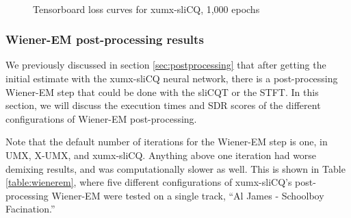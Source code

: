 \documentclass[report.tex]{subfiles}
\begin{document}
\begin{figure}[ht]
	\centering
	\\
	\caption{Tensorboard loss curves for xumx-sliCQ, 1,000 epochs}
	\label{fig:networkloss}
\end{figure}

\newpagefill

\subsubsection{Wiener-EM post-processing results}
\label{sec:wienerconfigs}

We previously discussed in section \ref{sec:postprocessing} that after getting the initial estimate with the xumx-sliCQ neural network, there is a post-processing Wiener-EM step that could be done with the sliCQT or the STFT. In this section, we will discuss the execution times and SDR scores of the different configurations of Wiener-EM post-processing.

Note that the default number of iterations for the Wiener-EM step is one, in UMX, X-UMX, and xumx-sliCQ. Anything above one iteration had worse demixing results, and was computationally slower as well. This is shown in Table \ref{table:wienerem}, where five different configurations of xumx-sliCQ's post-processing Wiener-EM were tested on a single track, ``Al James - Schoolboy Facination.''
\end{document}
